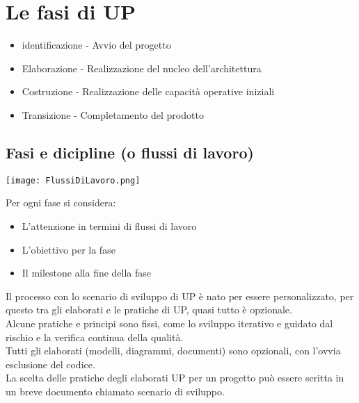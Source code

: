  \section{Le fasi di UP}
 \begin{itemize}
    \item identificazione - Avvio del progetto
    \item Elaborazione - Realizzazione del nucleo dell'architettura
    \item Costruzione - Realizzazione delle capacità operative iniziali
    \item Transizione - Completamento del prodotto
 \end{itemize}
\subsection{Fasi e dicipline (o flussi di lavoro)}
\begin{center}
    \texttt{[image: FlussiDiLavoro.png]}
\end{center}
Per ogni fase si considera:
\begin{itemize}
    \item L'attenzione in termini di flussi di lavoro
    \item L'obiettivo per la fase
    \item Il milestone alla fine della fase
\end{itemize}
Il processo con lo scenario di sviluppo di UP è nato per essere personalizzato,
per questo tra gli elaborati e le pratiche di UP, quasi tutto è opzionale.
\\ Alcune pratiche e principi sono fissi, come lo sviluppo iterativo e guidato dal rischio
e la verifica continua della qualità.
\\ Tutti gli elaborati (modelli, diagrammi, documenti) sono opzionali, con l'ovvia
esclusione del codice.
\\ La scelta delle pratiche degli elaborati UP per un progetto può essere scritta in un
breve documento chiamato scenario di sviluppo. 